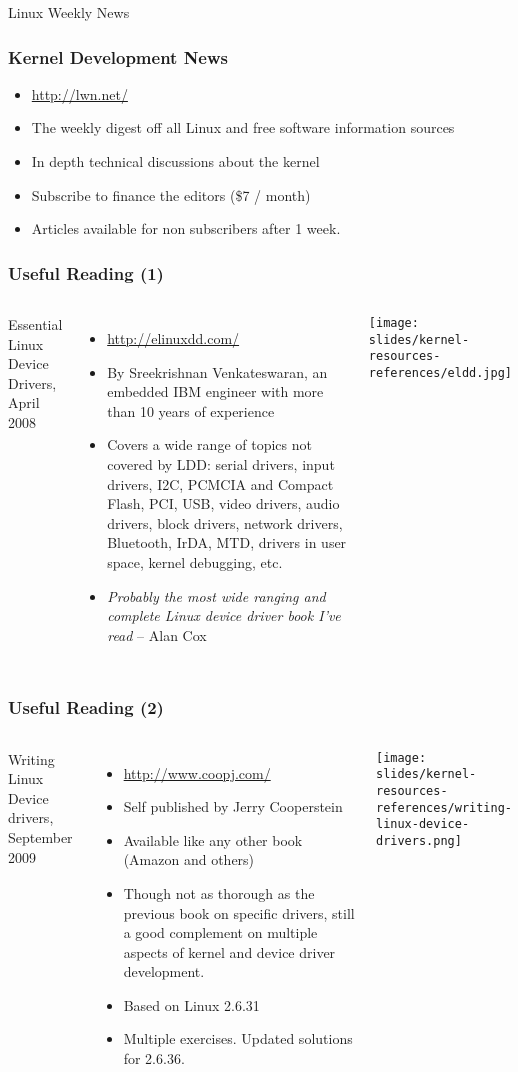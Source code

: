 \begin{frame}
  Linux Weekly News
  \frametitle{Kernel Development News}
  \begin{itemize}
  \item \url{http://lwn.net/}
  \item The weekly digest off all Linux and free software
    information sources
  \item In depth technical discussions about the kernel
  \item Subscribe to finance the editors (\$7 / month)
  \item Articles available for non subscribers after 1 week.
  \end{itemize}
\end{frame}

\begin{frame}
  \frametitle{Useful Reading (1)}
  \begin{columns}
    Essential Linux Device Drivers, April 2008
    \begin{itemize}
    \item \url{http://elinuxdd.com/}
    \item By Sreekrishnan Venkateswaran, an embedded IBM engineer
      with more than 10 years of experience
    \item Covers a wide range of topics not covered by LDD: serial
      drivers, input drivers, I2C, PCMCIA and Compact Flash, PCI,
      USB, video drivers, audio drivers, block drivers, network
      drivers, Bluetooth, IrDA, MTD, drivers in user space, kernel
      debugging, etc.
    \item \emph{Probably the most wide ranging and complete Linux
          device driver book I've read} -- Alan Cox
    \end{itemize}
    \texttt{[image: slides/kernel-resources-references/eldd.jpg]}
  \end{columns}
\end{frame}

\begin{frame}
  \frametitle{Useful Reading (2)}
  \begin{columns}
    Writing Linux Device drivers, September 2009
    \begin{itemize}
    \item \url{http://www.coopj.com/}
    \item Self published by Jerry Cooperstein
    \item Available like any other book (Amazon and others)
    \item Though not as thorough as the previous book on specific
      drivers, still a good complement on multiple aspects of kernel
      and device driver development.
    \item Based on Linux 2.6.31
    \item Multiple exercises. Updated solutions for 2.6.36.
    \end{itemize}
    \texttt{[image: slides/kernel-resources-references/writing-linux-device-drivers.png]}
  \end{columns}
\end{frame}

